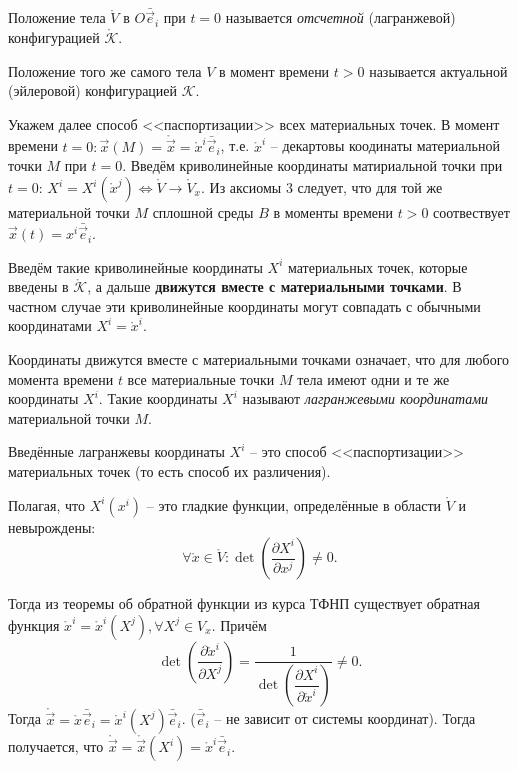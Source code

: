 Положение тела $\mathring{V}$ в $O\bar{\vec{e}}_i$ при $t=0$ называется \emph{отсчетной}
(лагранжевой) конфигурацией $\mathring{\mathcal{K}}$.

Положение того же самого тела $V$ в момент времени $t > 0$ называется актуальной (эйлеровой)
конфигурацией $\mathcal{K}$.

Укажем далее способ <<паспортизации>> всех материальных точек. В момент времени $t = 0 :
\vec{x}(M) = \mathring{\vec{x}} = \mathring{x}^{i} \bar{\vec{e}}_i$, т.е. $\mathring{x}^{i}$
-- декартовы коодинаты материальной
точки $M$ при $t=0$. Введём криволинейные координаты матириальной точки при $t=0$:
$X^i = X^i(\mathring{x}^j) \Leftrightarrow \mathring{V} \to \mathring{V}_x$. Из аксиомы 3 следует, что для той же 
материальной точки $M$ сплошной среды $B$ в моменты времени $t > 0$ соотвествует $\vec{x}(t) = x^i \bar{\vec{e}}_i$.

Введём такие криволинейные координаты $X^i$ материальных точек, которые введены в
$\mathring{\mathcal{K}}$, а дальше \textbf{движутся вместе с материальными точками}. В частном
случае эти криволинейные координаты могут совпадать с обычными координатами $X^i = \mathring{x}^i$.

\begin{figure}[H]
	\centering
	
\end{figure}


Координаты движутся вместе с материальными точками означает, что для любого момента времени $t$ 
все материальные точки $M$ тела имеют одни и те же координаты $X^i$. Такие координаты $X^i$ называют
\emph{лагранжевыми координатами} материальной точки $M$.

Введённые лагранжевы координаты $X^i$ -- это способ <<паспортизации>> материальных точек (то есть
способ их различения).

Полагая, что $X^i(x^i)$ -- это гладкие функции, определённые в области $\mathring{V}$ и невырождены:
\[
  \forall \mathring{x} \in \mathring V : \det \left( \dfrac{\partial X^i}{\partial x^j}  \right) \neq 0.
\]

Тогда из теоремы об обратной функции из курса ТФНП существует обратная функция $\mathring{x}^i
= \mathring{x}^i (X^j), \forall X^j \in V_x$. Причём
\[
  \det \left( \dfrac{\partial \mathring{x}^i}{\partial X^{j}}  \right)
  = \dfrac{1}{\det \left( \dfrac{\partial X^i}{\partial \mathring{x}^i}  \right) } \neq 0.
\]
Тогда $\mathring{\vec{x}} = \mathring{x} \bar{\vec{e}}_i = \mathring{x}^i (X^j) \bar{\vec{e}}_i$.
($\bar{\vec{e}}_i$ -- не зависит от системы координат). Тогда получается, что
$\mathring{\vec{x}} = \mathring{\vec{x}} ( X^i) = \mathring{x}^i \bar{\vec{e}}_i$.


